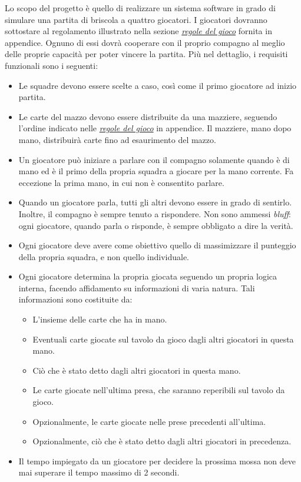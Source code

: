 \documentclass[a4paper,12pt]{article}
\begin{document}
Lo scopo del progetto è quello di realizzare un sistema software in grado di simulare una partita di briscola a quattro giocatori. I giocatori dovranno sottostare al regolamento illustrato nella sezione  \emph{\hyperref[briscola-rules]{regole del gioco}} fornita in appendice. Ognuno di essi dovrà cooperare con il proprio compagno al meglio delle proprie capacità per poter vincere la partita. Più nel dettaglio, i requisiti funzionali sono i seguenti:
\begin{itemize}
	\item Le squadre devono essere scelte a caso, così come il primo giocatore ad inizio partita.
	\item Le carte del mazzo devono essere distribuite da una mazziere, seguendo l'ordine indicato nelle \emph{\hyperref[briscola-rules]{regole del gioco}} in appendice. Il mazziere, mano dopo mano, distribuirà carte fino ad esaurimento del mazzo.
	\item Un giocatore può iniziare a parlare con il compagno solamente quando è di mano ed è il primo della propria squadra a giocare per la mano corrente. Fa eccezione la prima mano, in cui non è consentito parlare.
	\item Quando un giocatore parla, tutti gli altri devono essere in grado di sentirlo. Inoltre, il compagno è sempre tenuto a rispondere.  Non sono ammessi \emph{bluff}: ogni giocatore, quando parla o risponde, è sempre obbligato a dire la verità.
	\item Ogni giocatore deve avere come obiettivo quello di massimizzare il punteggio della propria squadra, e non quello individuale.
	\item Ogni giocatore determina la propria giocata seguendo un propria logica interna, facendo affidamento su informazioni di varia natura. Tali informazioni sono costituite da:
	\begin{itemize}
		\item L'insieme delle carte che ha in mano.
		\item Eventuali carte giocate sul tavolo da gioco dagli altri giocatori in questa mano.
		\item Ciò che è stato detto dagli altri giocatori in questa mano.
		\item Le carte giocate nell'ultima presa, che saranno reperibili sul tavolo da gioco.
		\item Opzionalmente, le carte giocate nelle prese precedenti all'ultima.
		\item Opzionalmente, ciò che è stato detto dagli altri giocatori in precedenza.
	\end{itemize}
	\item Il tempo impiegato da un giocatore per decidere la prossima mossa non deve mai superare il tempo massimo di 2 secondi.
\end{itemize}
\end{document}
